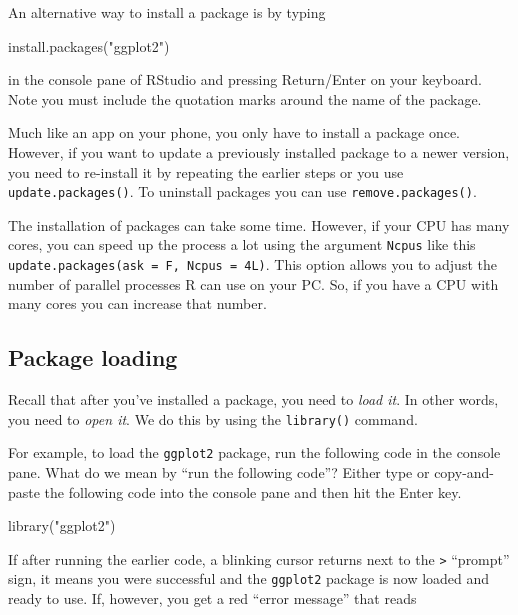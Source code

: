 \documentclass[
  12pt,
  oneside]{book}
\newenvironment{Shaded}{\begin{snugshade}}{\end{snugshade}}
\newcommand{\FunctionTok}[1]{\textcolor[rgb]{0.00,0.00,0.00}{#1}}
\newcommand{\NormalTok}[1]{#1}
\newcommand{\StringTok}[1]{\textcolor[rgb]{0.31,0.60,0.02}{#1}}
\theoremstyle{definition}
\theoremstyle{definition}
\theoremstyle{definition}
\theoremstyle{definition}
\theoremstyle{remark}
\begin{document}
An alternative way to install a package is by typing

\begin{Shaded}
\begin{Highlighting}[]
\FunctionTok{install.packages}\NormalTok{(}\StringTok{"ggplot2"}\NormalTok{)}
\end{Highlighting}
\end{Shaded}

in the console pane of RStudio and pressing Return/Enter on your keyboard. Note you must include the quotation marks around the name of the package.

Much like an app on your phone, you only have to install a package once. However, if you want to update a previously installed package to a newer version, you need to re-install it by repeating the earlier steps or you use \texttt{update.packages()}. To uninstall packages you can use \texttt{remove.packages()}.

The installation of packages can take some time. However, if your CPU has many cores, you can speed up the process a lot using the argument \texttt{Ncpus} like this \texttt{update.packages(ask\ =\ F,\ Ncpus\ =\ 4L)}. This option allows you to adjust the number of parallel processes R can use on your PC. So, if you have a CPU with many cores you can increase that number.

\hypertarget{package-loading}{%
\subsection{Package loading}\label{package-loading}}

Recall that after you've installed a package, you need to \emph{load it}. In other words, you need to \emph{open it}. We do this by using the \texttt{library()} command. 

For example, to load the \texttt{ggplot2} package, run the following code in the console pane. What do we mean by ``run the following code''? Either type or copy-and-paste the following code into the console pane and then hit the Enter key.

\begin{Shaded}
\begin{Highlighting}[]
\FunctionTok{library}\NormalTok{(}\StringTok{"ggplot2"}\NormalTok{)}
\end{Highlighting}
\end{Shaded}

If after running the earlier code, a blinking cursor returns next to the \texttt{\textgreater{}} ``prompt'' sign, it means you were successful and the \texttt{ggplot2} package is now loaded and ready to use. If, however, you get a red ``error message'' that reads
\end{document}
